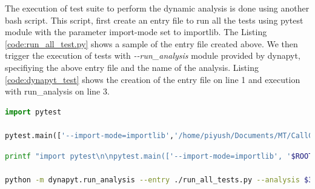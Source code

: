 The execution of test suite to perform the dynamic analysis is done using another bash script.
This script, first create an entry file to run all the tests using pytest module with the parameter import-mode set to importlib.
The Listing \ref{code:run_all_test.py} shows a sample of the entry file created above.
We then trigger the execution of tests with \textit{\--\--run\_analysis} module provided by dynapyt, specifiying the above entry file and the name of the analysis.
Listing \ref{code:dynapyt_test} shows the creation of the entry file on line 1 and execution with run\_analysis on line 3.
\begin{lstlisting}[caption=DynaPyt Execution Entry File,label=code:run_all_test.py,language=Python]
import pytest

pytest.main(['--import-mode=importlib','/home/piyush/Documents/MT/CallGraph/flask-api/flask_api/tests/'])
\end{lstlisting}
\begin{lstlisting}[caption=DynaPyt Test Suite Execution,label=code:dynapyt_test,language=Bash]
printf "import pytest\n\npytest.main(['--import-mode=importlib', '$ROOT_DIR/temp/project$2/$4'])\n" > run_all_tests.py

python -m dynapyt.run_analysis --entry ./run_all_tests.py --analysis $3
\end{lstlisting}

